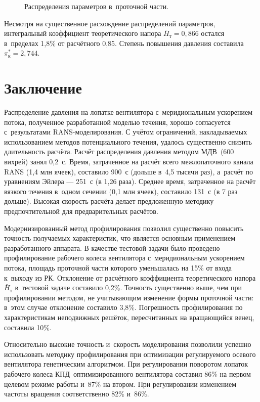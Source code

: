 \begin{enumerate}
\begin{figure}[htb]
	\caption{Распределения параметров в~проточной части.}
\end{figure}

Несмотря на существенное расхождение распределений параметров, интегральный коэффициент теоретического напора \(\bar{H}_\text{т}=0,866\) остался в~пределах 1,8\% от расчётного 0,85.
Степень повышения давления составила \(\pi_\text{к}^{*}=2,744\).

\section{Заключение}

Распределение давления на лопатке вентилятора с~меридиональным ускорением потока, полученное разработанной моделью течения, хорошо согласуется с~результатами RANS-моделирования.
С учётом ограничений, накладываемых использованием методов потенциального течения, удалось существенно снизить длительность расчёта.
Расчёт распределения давления методом МДВ~(600 вихрей) занял 0,2~с.
Время, затраченное на расчёт всего межлопаточного канала RANS (1,4 млн ячеек), составило 900~с (дольше в~4,5 тысячи раз), а~расчёт по уравнениям Эйлера — 251~с (в 1,26 раза).
Среднее время, затраченное на расчёт вязкого течения в~одном сечении (0,1 млн ячеек), составило 131~с (в 7 раз дольше).
Высокая скорость расчёта делает предложенную методику предпочтительной для предварительных расчётов.

Модернизированный метод профилирования позволил существенно повысить точность получаемых характеристик, что является основным применением разработанного аппарата.
В качестве тестовой задачи было проведено профилирование рабочего колеса вентилятора с~меридиональным ускорением потока, площадь проточной части которого уменьшалась на 15\% от входа к~выходу из РК.
Отклонение от расчётного коэффициента теоретического напора \(\bar{H}_\text{т}\) в~тестовой задаче составило 0,2\%.
Точность существенно выше, чем при профилировании методом, не учитывающим изменение формы проточной части: в~этом случае отклонение составило 3,8\%.
Погрешность профилирования по характеристикам неподвижных решёток, пересчитанных на вращающийся венец, составила 10\%.

Относительно высокие точность и~скорость моделирования позволили успешно использовать методику профилирования при оптимизации регулируемого осевого вентилятора генетическим алгоритмом.
При регулировании поворотом лопаток рабочего колеса КПД~оптимизированного вентилятора составил 86\% на первом целевом режиме работы и~87\% на втором.
При регулировании изменением частоты вращения соответственно 82\% и~86\%.


\end{enumerate}
